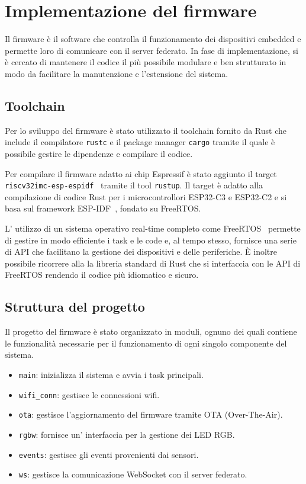 \chapter{Implementazione del firmware}

Il firmware è il software che controlla il funzionamento dei dispositivi embedded e permette loro di comunicare con il server federato.
In fase di implementazione, si è cercato di mantenere il codice il più possibile modulare e 
ben strutturato in modo da facilitare la manutenzione e l'estensione del sistema.

\section{Toolchain}

Per lo sviluppo del firmware è stato utilizzato il toolchain fornito da Rust che include il compilatore
\texttt{rustc} e il package manager \texttt{cargo} tramite il quale è possibile gestire le dipendenze e compilare il codice.

Per compilare il firmware adatto ai chip Espressif è stato aggiunto il target \texttt{riscv32imc-esp-espidf}~\cite{rust_on_esp} tramite il 
tool \texttt{rustup}. Il target è adatto alla compilazione di codice Rust per i microcontrollori ESP32-C3 e ESP32-C2
e si basa sul framework ESP-IDF~\cite{esp_idf}, fondato su FreeRTOS.

L' utilizzo di un sistema operativo real-time completo come FreeRTOS~\cite{freertos} permette di gestire in modo efficiente i task e le code
e, al tempo stesso, fornisce una serie di API che facilitano la gestione dei dispositivi e delle periferiche. È inoltre possibile ricorrere alla
la libreria standard di Rust che si interfaccia con le API di FreeRTOS rendendo il codice più idiomatico e sicuro.

\section{Struttura del progetto}

Il progetto del firmware è stato organizzato in moduli, ognuno dei quali contiene le funzionalità 
necessarie per il funzionamento di ogni singolo componente del sistema.

\begin{itemize}
    \item \texttt{main}: inizializza il sistema e avvia i task principali.
    \item \texttt{wifi\_conn}: gestisce le connessioni wifi.
    \item \texttt{ota}: gestisce l'aggiornamento del firmware tramite OTA (Over-The-Air).
    \item \texttt{rgbw}: fornisce un' interfaccia per la gestione dei LED RGB.
    \item \texttt{events}: gestisce gli eventi provenienti dai sensori.
    \item \texttt{ws}: gestisce la comunicazione WebSocket con il server federato.
\end{itemize}

